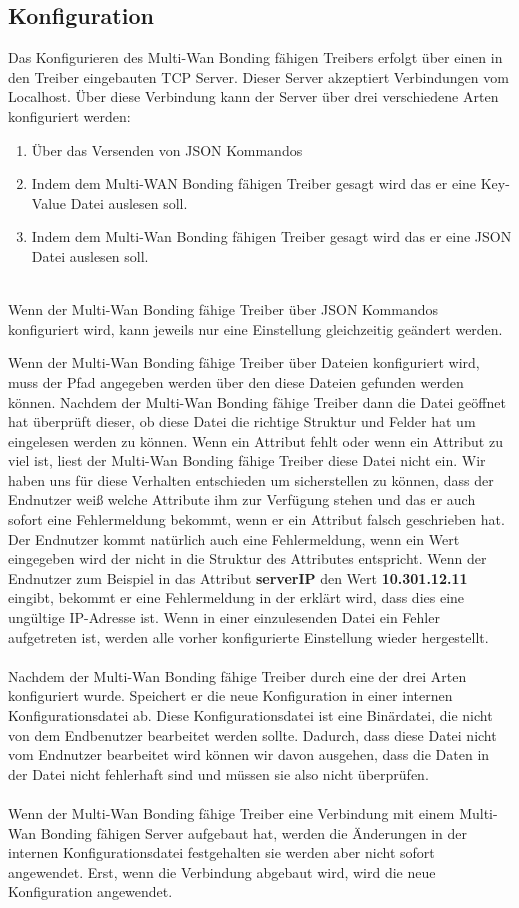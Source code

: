 \subsection{Konfiguration}
Das Konfigurieren des Multi-Wan Bonding fähigen Treibers erfolgt über einen in den Treiber eingebauten TCP Server. Dieser Server akzeptiert Verbindungen vom Localhost. Über diese Verbindung kann der Server über drei verschiedene Arten konfiguriert werden:
\\
\begin{enumerate}
    \item Über das Versenden von JSON Kommandos
    \item Indem dem Multi-WAN Bonding fähigen Treiber gesagt wird das er eine Key-Value Datei auslesen soll.
    \item Indem dem Multi-Wan Bonding fähigen Treiber gesagt wird das er eine JSON Datei auslesen soll.
\end{enumerate}
\ \\
Wenn der Multi-Wan Bonding fähige Treiber über JSON Kommandos konfiguriert wird, kann jeweils nur eine Einstellung gleichzeitig geändert werden.

\newpage

Wenn der Multi-Wan Bonding fähige Treiber über Dateien konfiguriert wird, muss der Pfad angegeben werden über den diese Dateien gefunden werden können. Nachdem der Multi-Wan Bonding fähige Treiber dann die Datei geöffnet hat überprüft dieser, ob diese Datei die richtige Struktur und Felder hat um eingelesen werden zu können. Wenn ein Attribut fehlt oder wenn ein Attribut zu viel ist, liest der Multi-Wan Bonding fähige Treiber diese Datei nicht ein. Wir haben uns für diese Verhalten entschieden um sicherstellen zu können, dass der Endnutzer weiß welche Attribute ihm zur Verfügung stehen und das er auch sofort eine Fehlermeldung bekommt, wenn er ein Attribut falsch geschrieben hat. Der Endnutzer kommt natürlich auch eine Fehlermeldung, wenn ein Wert eingegeben wird der nicht in die Struktur des Attributes entspricht. Wenn der Endnutzer zum Beispiel in das Attribut \textbf{serverIP} den Wert \textbf{10.301.12.11} eingibt, bekommt er eine Fehlermeldung in der erklärt wird, dass dies eine ungültige IP-Adresse ist. Wenn in einer einzulesenden Datei ein Fehler aufgetreten ist, werden alle vorher konfigurierte Einstellung wieder hergestellt. 
\\\\
Nachdem der Multi-Wan Bonding fähige Treiber durch eine der drei Arten konfiguriert wurde. Speichert er die neue Konfiguration in einer internen Konfigurationsdatei ab. Diese Konfigurationsdatei ist eine Binärdatei, die nicht von dem Endbenutzer bearbeitet werden sollte. Dadurch, dass diese Datei nicht vom Endnutzer bearbeitet wird können wir davon ausgehen, dass die Daten in der Datei nicht fehlerhaft sind und müssen sie also nicht   überprüfen.
\\\\
Wenn der Multi-Wan Bonding fähige Treiber eine Verbindung mit einem Multi-Wan Bonding fähigen Server aufgebaut hat, werden die Änderungen in der internen Konfigurationsdatei festgehalten sie werden aber nicht sofort angewendet. Erst, wenn die Verbindung abgebaut wird, wird die neue Konfiguration angewendet.
